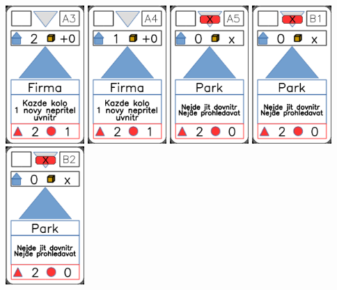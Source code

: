 \documentclass[a4paper]{article}
\begin{document}
	\includegraphics[width=3.0cm]{img-3_17}
	\includegraphics[width=3.0cm]{img-3_18}
	\includegraphics[width=3.0cm]{img-3_19}
	\includegraphics[width=3.0cm]{img-3_20}
	\includegraphics[width=3.0cm]{img-3_21}
\end{document}
